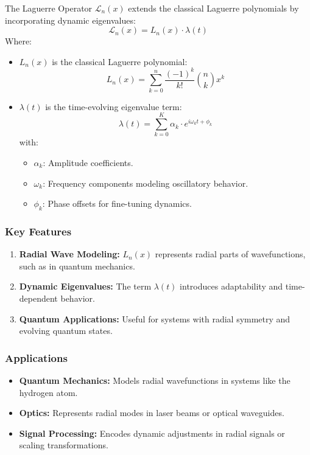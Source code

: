 \documentclass{article}
\theoremstyle{plain}
\begin{document}
\begin{itemize}
The Laguerre Operator \( \mathcal{L}_n(x) \) extends the classical Laguerre polynomials by incorporating dynamic eigenvalues:
\[
\mathcal{L}_n(x) = L_n(x) \cdot \lambda(t)
\]
Where:
\begin{itemize}
    \item \( L_n(x) \) is the classical Laguerre polynomial:
    \[
    L_n(x) = \sum_{k=0}^n \frac{(-1)^k}{k!} \binom{n}{k} x^k
    \]
    \item \( \lambda(t) \) is the time-evolving eigenvalue term:
    \[
    \lambda(t) = \sum_{k=0}^K \alpha_k \cdot e^{i\omega_k t + \phi_k}
    \]
    with:
    \begin{itemize}
        \item \( \alpha_k \): Amplitude coefficients.
        \item \( \omega_k \): Frequency components modeling oscillatory behavior.
        \item \( \phi_k \): Phase offsets for fine-tuning dynamics.
    \end{itemize}
\end{itemize}

\subsubsection*{Key Features}
\begin{enumerate}
    \item \textbf{Radial Wave Modeling:} \( L_n(x) \) represents radial parts of wavefunctions, such as in quantum mechanics.
    \item \textbf{Dynamic Eigenvalues:} The term \( \lambda(t) \) introduces adaptability and time-dependent behavior.
    \item \textbf{Quantum Applications:} Useful for systems with radial symmetry and evolving quantum states.
\end{enumerate}

\subsubsection*{Applications}
\begin{itemize}
    \item \textbf{Quantum Mechanics:} Models radial wavefunctions in systems like the hydrogen atom.
    \item \textbf{Optics:} Represents radial modes in laser beams or optical waveguides.
    \item \textbf{Signal Processing:} Encodes dynamic adjustments in radial signals or scaling transformations.
\end{itemize}


\end{itemize}
\end{document}
